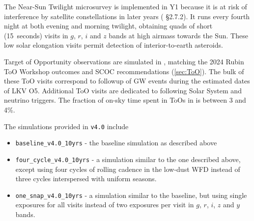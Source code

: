 The Near-Sun Twilight microsurvey is implemented in Y1 because it is at risk of interference by satellite constellations in later years ( \S2.7.2). It runs every fourth night at both evening and morning twilight, obtaining quads of short (15~seconds) visits in $g$, $r$, $i$ and $z$ bands at high airmass towards the Sun. These low solar elongation visits permit detection of interior-to-earth asteroids. %

Target of Opportunity observations are simulated in , matching the 2024 Rubin ToO Workshop outcomes and SCOC recommendations (\autoref{sec:ToO}). The bulk of these ToO visits correspond to followup of GW events during the estimated dates of LKV O5. Additional ToO visits are dedicated to following Solar System and neutrino triggers. The fraction of on-sky time spent in ToOs in  is between 3 and 4\%. 

The simulations provided in \texttt{v4.0} include
\begin{itemize}
    \item \texttt{baseline\_v4.0\_10yrs} - the baseline simulation as described above
    \item \texttt{four\_cycle\_v4.0\_10yrs} - a simulation similar to the one described above, except using four cycles of rolling cadence in the low-dust WFD instead of three cycles interspersed with uniform seasons. 
    \item \texttt{one\_snap\_v4.0\_10yrs} - a simulation similar to the baseline, but using single exposures for all visits instead of two exposures per visit in $g$, $r$, $i$, $z$ and $y$ bands. %
\end{itemize}

